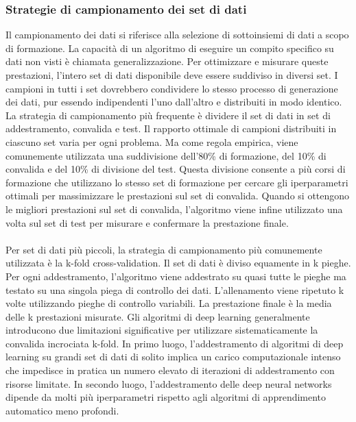 \documentclass[12pt,a4paper]{report}
\begin{document}
\subsubsection{Strategie di campionamento dei set di dati}
Il campionamento dei dati si riferisce alla selezione di sottoinsiemi di dati a scopo di formazione. La capacità di un algoritmo di eseguire un compito specifico su dati non visti è chiamata generalizzazione. Per ottimizzare e misurare queste prestazioni, l'intero set di dati disponibile deve essere suddiviso in diversi set. I campioni in tutti i set dovrebbero condividere lo stesso processo di generazione dei dati, pur essendo indipendenti l'uno dall'altro e distribuiti in modo identico.
La strategia di campionamento più frequente è dividere il set di dati in set di addestramento, convalida e test.
Il rapporto ottimale di campioni distribuiti in ciascuno set varia per ogni problema. Ma come regola empirica, viene comunemente utilizzata una suddivisione dell'80\% di formazione, del 10\% di convalida e del 10\% di divisione del test. Questa divisione consente a più corsi di formazione che utilizzano lo stesso set di formazione per cercare gli iperparametri ottimali per massimizzare le prestazioni sul set di convalida. Quando si ottengono le migliori prestazioni sul set di convalida, l'algoritmo viene infine utilizzato una volta sul set di test per misurare e confermare la prestazione finale.\\
\\
Per set di dati più piccoli, la strategia di campionamento più comunemente utilizzata è la k-fold cross-validation. Il set di dati è diviso equamente in k pieghe. Per ogni addestramento, l'algoritmo viene addestrato su quasi tutte le pieghe ma testato su una singola piega di controllo dei dati. L'allenamento viene ripetuto k volte utilizzando pieghe di controllo variabili. La prestazione finale è la media delle k prestazioni misurate.
Gli algoritmi di deep learning generalmente introducono due limitazioni significative per utilizzare sistematicamente la convalida incrociata k-fold. In primo luogo, l'addestramento di algoritmi di deep learning su grandi set di dati di solito implica un carico computazionale intenso che impedisce in pratica un numero elevato di iterazioni di addestramento con risorse limitate. In secondo luogo, l'addestramento delle deep neural networks dipende da molti più iperparametri rispetto agli algoritmi di apprendimento automatico meno profondi.\\
\end{document}
